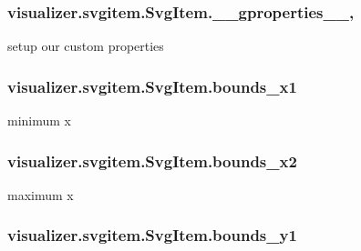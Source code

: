 \subsubsection[{\texorpdfstring{\+\_\+\+\_\+gproperties\+\_\+\+\_\+}{__gproperties__}}]{\setlength{\rightskip}{0pt plus 5cm}visualizer.\+svgitem.\+Svg\+Item.\+\_\+\+\_\+gproperties\+\_\+\+\_\+\hspace{0.3cm}{\ttfamily [static]}, {\ttfamily [private]}}\hypertarget{classvisualizer_1_1svgitem_1_1SvgItem_a7cee90c9cf9904adfd3688aaa4416ac0}{}\label{classvisualizer_1_1svgitem_1_1SvgItem_a7cee90c9cf9904adfd3688aaa4416ac0}


setup our custom properties 

\subsubsection[{\texorpdfstring{bounds\+\_\+x1}{bounds_x1}}]{\setlength{\rightskip}{0pt plus 5cm}visualizer.\+svgitem.\+Svg\+Item.\+bounds\+\_\+x1}\hypertarget{classvisualizer_1_1svgitem_1_1SvgItem_aad26c81fd84200b922866a9ad3119165}{}\label{classvisualizer_1_1svgitem_1_1SvgItem_aad26c81fd84200b922866a9ad3119165}


minimum x 

\subsubsection[{\texorpdfstring{bounds\+\_\+x2}{bounds_x2}}]{\setlength{\rightskip}{0pt plus 5cm}visualizer.\+svgitem.\+Svg\+Item.\+bounds\+\_\+x2}\hypertarget{classvisualizer_1_1svgitem_1_1SvgItem_a5c89f17fecfe68834e627463abb75634}{}\label{classvisualizer_1_1svgitem_1_1SvgItem_a5c89f17fecfe68834e627463abb75634}


maximum x 

\subsubsection[{\texorpdfstring{bounds\+\_\+y1}{bounds_y1}}]{\setlength{\rightskip}{0pt plus 5cm}visualizer.\+svgitem.\+Svg\+Item.\+bounds\+\_\+y1}\hypertarget{classvisualizer_1_1svgitem_1_1SvgItem_aa0f146c39e7b9642ece6945bd2a88112}{}\label{classvisualizer_1_1svgitem_1_1SvgItem_aa0f146c39e7b9642ece6945bd2a88112}


